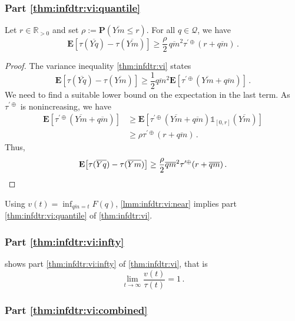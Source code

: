 \documentclass{article}
\newcommand*{\mc}[1]{\mathcal{#1}}
\newcommand{\R}{\mathbb{R}}
\newcommand{\Rpp}{\R_{>0}}
\newcommand{\lab}{\left[} %
\newcommand{\rab}{\right]} %
\newcommand{\ab}[1]{\lab #1 \rab} %
\newcommand{\abOf}[1]{\!\ab{#1}} %
\renewcommand{\Pr}{\mathbf{P}} %
\newcommand{\Prof}[1]{\Pr(#1)}
\newcommand{\E}{\mathbf{E}} %
\newcommand{\EOf}[1]{\E\abOf{#1}}
\newcommand{\ind}{\mathds{1}}%
\newcommand{\eqfs}{\,.}
\newcommand{\ol}[2]{\overline{#1#2}}
\newcommand{\tran}{\tau}
\newcommand{\ddrtran}{\tau^{\prime\oplus}}
\begin{document}
\subsubsection{Part \ref{thm:infdtr:vi:quantile}}
%
\begin{lemma}\label{lmm:infdtr:vi:near}
    Let $r\in\Rpp$ and set $\rho := \Prof{\ol Ym\leq r}$.
    For all $q\in\mc Q$, we have
    \begin{equation}
        \EOf{\tran(\ol Y{q}) - \tran(\ol Ym)}
        \geq
        \frac\rho2\, \ol qm^2 \ddrtran(r +  \ol qm)
        \eqfs
    \end{equation}
\end{lemma}
%
\begin{proof}
    The variance inequality \cref{thm:infdtr:vi} states
    \begin{equation}
        \EOf{\tran(\ol Y{q}) - \tran(\ol Ym)}
        \geq
        \frac12
        \ol qm^2
        \EOf{\ddrtran(\ol Ym +  \ol qm)}
        \eqfs
    \end{equation}
    We need to find a suitable lower bound on the expectation in the last term. As $\ddrtran$ is nonincreasing, we have
    \begin{align}
        \EOf{\ddrtran(\ol Ym +  \ol qm)}
        &\geq
        \EOf{\ddrtran(\ol Ym +  \ol qm)\ind_{[0,r]}(\ol Ym)}
        \\&\geq
        \rho \ddrtran(r +  \ol qm)
        \eqfs
    \end{align}
    Thus,
    \begin{equation}
        \EOf{\tran(\ol Y{q}) - \tran(\ol Ym)}
        \geq
        \frac\rho2  \ol qm^2
        \ddrtran(r +  \ol qm)
        \eqfs
        \qedhere
    \end{equation}
\end{proof}
%
Using $v(t) = \inf_{\ol qm = t} F(q)$, \cref{lmm:infdtr:vi:near} implies part \ref{thm:infdtr:vi:quantile} of \cref{thm:infdtr:vi}.
%
\subsubsection{Part \ref{thm:infdtr:vi:infty}}

\cite[Theorem 3.5]{varinequ} shows part \ref{thm:infdtr:vi:infty} of \cref{thm:infdtr:vi}, that is
\begin{equation}
    \lim_{t\to\infty} \frac{v(t)}{\tran(t)} = 1
    \eqfs
\end{equation}

\subsubsection{Part \ref{thm:infdtr:vi:combined}}
\end{document}

